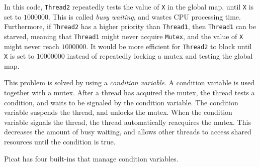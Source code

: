 In this code, \texttt{Thread2} repeatedly tests the value of \texttt{X} in the global map, until \texttt{X} is set to $1000000$.  This is called \emph{busy waiting}, and wastes CPU processing time.  Furthermore, if \texttt{Thread2} has a higher priority than \texttt{Thread1}, then \texttt{Thread1} can be starved, meaning that \texttt{Thread1} might never acquire \texttt{Mutex}, and the value of \texttt{X} might never reach $1000000$.  It would be more efficient for \texttt{Thread2} to block until \texttt{X} is set to $10000000$ instead of repeatedly locking a mutex and testing the global map.  

This problem is solved by using a \emph{condition variable}.  A condition variable is used together with a mutex.  After a thread has acquired the mutex, the thread tests a condition, and waits to be signaled by the condition variable.  The condition variable suspends the thread, and unlocks the mutex.  When the condition variable signals the thread, the thread automatically reacquires the mutex.  This decreases the amount of busy waiting, and allows other threads to access shared resources until the condition is true.

Picat has four built-ins that manage condition variables.

